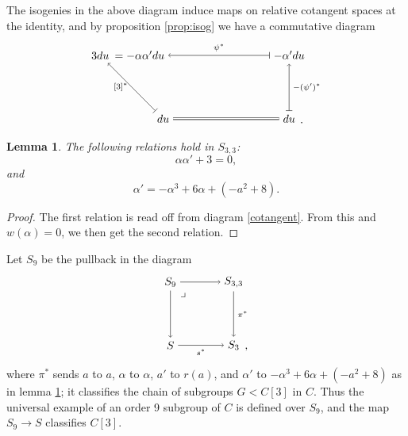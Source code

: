 \documentclass{gtpart}
\newtheorem{lem}[thm]{Lemma}
\theoremstyle{definition}
\theoremstyle{remark}
\newcommand{\A}{\alpha}
\begin{document}
The isogenies in the above diagram induce maps on relative cotangent spaces at the identity, 
and by proposition \ref{prop:isog} we have a commutative diagram 
\begin{equation}
\label{cotangent}
 \begin{tikzpicture}[baseline=(current bounding box.center)]
         \node (LT) at (0, 2) {$3 du$}; 
         \node (MT) at (1.25, 2) {$= -\A \A' du$}; 
         \node (RT) at (6, 2) {$-\A' du$}; 
         \node (LB) at (2, 0) {$du$}; 
         \node (RB) at (6, 0) {$du$}; 
         \node at (6.4, -0.125) {.}; 
         \draw [|->] (RT) -- node [above] {$\scriptstyle \psi^*$} (MT);
         \draw [|->] (LB) -- node [left] {$\scriptstyle [3]^*$} (LT); 
         \draw [|->] (RB) -- node [right] {$\scriptstyle -(\psi')^*$} (RT); 
         \draw [double distance=1.3pt] (LB) -- (RB); 
 \end{tikzpicture}
\end{equation}

\begin{lem}
\label{lem:-p}
 The following relations hold in $S_{3,3}$: 
 \[
  \A \A' + 3 = 0, 
 \]
 and 
 \[
  \A' = -\A^3 + 6 \A + (-a^2 + 8).  
 \]
\end{lem}
\begin{proof}
 The first relation is read off from diagram \eqref{cotangent}.  From this and $w(\A) = 0$, we then get the second relation.  
\end{proof}

Let $S_9$ be the pullback in the diagram 
\begin{equation}
\label{S9}
 \begin{tikzpicture}[baseline=(current bounding box.center)]
         \node (LT) at (0, 2) {$S_9$}; 
         \node (RT) at (2, 2) {$S_{3,3}$}; 
         \node (LB) at (0, 0) {$S$}; 
         \node (RB) at (2, 0) {$S_3$}; 
         \node at (2.4, -0.125) {,}; 
         \node at (0.4, 1.6) {$\lrcorner$}; 
         \draw [->] (LT) --  (RT); 
         \draw [->] (LT) --  (LB); 
         \draw [->] (RT) -- node [right] {$\scriptstyle \pi^*$} (RB); 
         \draw [->] (LB) -- node [below] {$\scriptstyle s^*$} (RB); 
 \end{tikzpicture}
\end{equation}
where $\pi^*$ sends $a$ to $a$, $\A$ to $\A$, $a'$ to $r(a)$, and $\A'$ to $-\A^3 + 6 \A + (-a^2 + 8)$ as in lemma \ref{lem:-p}; 
it classifies the chain of subgroups $G < C[3]$ in $C$.  Thus the universal example of an order 9 subgroup of $C$ 
is defined over $S_9$, and the map $S_9 \to S$ classifies $C[3]$.  
\end{document}
